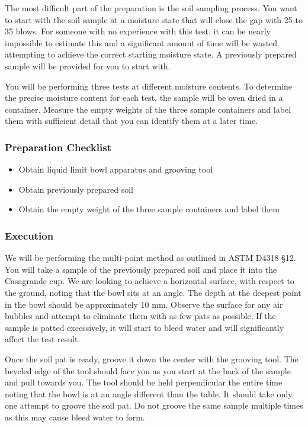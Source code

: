 \documentclass[12pt]{article}
\begin{document}
The most difficult part of the preparation is the soil sampling process. You want to start with the soil sample at a moisture state that will close the gap with 25 to 35 blows. For someone with no experience with this test, it can be nearly impossible to estimate this and a significant amount of time will be wasted attempting to achieve the correct starting moisture state. A previously prepared sample will be provided for you to start with.

You will be performing three tests at different moisture contents. To determine the precise moisture content for each test, the sample will be oven dried in a container. Measure the empty weights of the three sample containers and label them with sufficient detail that you can identify them at a later time.

\subsubsection*{Preparation Checklist}
\begin{itemize}
    \item Obtain liquid limit bowl apparatus and grooving tool
    \item Obtain previously prepared soil
    \item Obtain the empty weight of the three sample containers and label them
\end{itemize}

\subsubsection{Execution}
We will be performing the multi-point method as outlined in ASTM D4318 \S12. You will take a sample of the previously prepared soil and place it into the Casagrande cup. We are looking to achieve a horizontal surface, with respect to the ground, noting that the bowl sits at an angle. The depth at the deepest point in the bowl should be approximately 10 mm. Observe the surface for any air bubbles and attempt to eliminate them with as few pats as possible. If the sample is patted excessively, it will start to bleed water and will significantly affect the test result.

Once the soil pat is ready, groove it down the center with the grooving tool. The beveled edge of the tool should face you as you start at the back of the sample and pull towards you. The tool should be held perpendicular the entire time noting that the bowl is at an angle different than the table. It should take only one attempt to groove the soil pat. Do not groove the same sample multiple times as this may cause bleed water to form.
\end{document}
